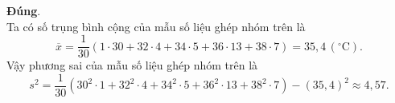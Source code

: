 \begin{ex}
{\begin{itemchoice}
 \itemch \textbf{Đúng}. 
 \\Ta có số trụng bình cộng của mẫu số liệu ghép nhóm trên là\\
 \[\overline{x}=\dfrac{1}{30} \left(1\cdot30+32\cdot4+34\cdot5+36\cdot13+38\cdot7\right)=35{,}4\,(^\circ \mathrm C).\]
 Vậy phương sai của mẫu số liệu ghép nhóm trên là 
 \[s^2=\dfrac{1}{30} \left(30^2\cdot1+32^2\cdot4+34^2\cdot5+36^2\cdot13+38^2\cdot7\right)-(35{,}4)^2\approx 4{,}57.\]
 \end{itemchoice}
 }
\end{ex}

